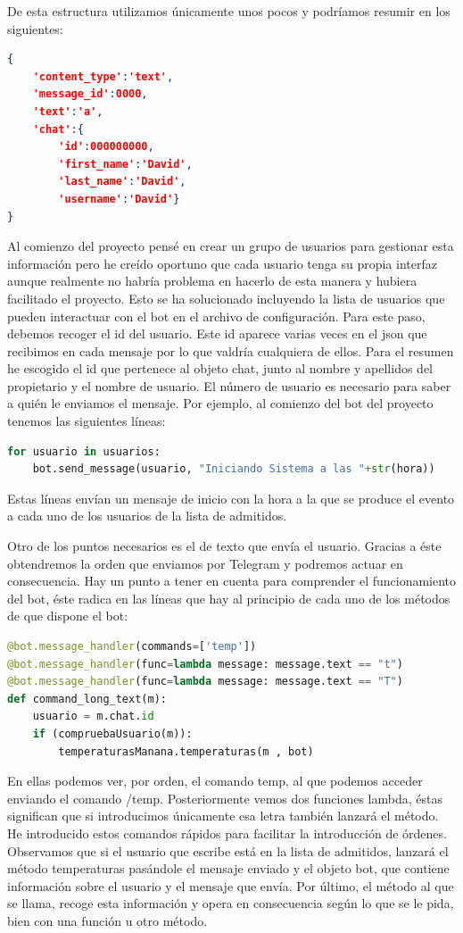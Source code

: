 De esta estructura utilizamos únicamente unos pocos y podríamos resumir en los siguientes:
\begin{lstlisting}[language=json,firstnumber=0, basicstyle=\small, caption={Resumen de los datos que utilizamos del mensaje de Telegram.}]
{
    'content_type':'text',
    'message_id':0000,
    'text':'a',
    'chat':{
        'id':000000000,
        'first_name':'David',
        'last_name':'David',
        'username':'David'}
}
\end{lstlisting}

Al comienzo del proyecto pensé en crear un grupo de usuarios para gestionar esta información pero he creído oportuno que cada usuario tenga su propia interfaz aunque realmente no habría problema en hacerlo de esta manera y hubiera facilitado el proyecto. Esto se ha solucionado incluyendo la lista de usuarios que pueden interactuar con el bot en el archivo de configuración. Para este paso, debemos recoger el id del usuario. Este id aparece varias veces en el json que recibimos en cada mensaje por lo que valdría cualquiera de ellos. Para el resumen he escogido el id que pertenece al objeto chat, junto al nombre y apellidos del propietario y el nombre de usuario.
El número de usuario es necesario para saber a quién le enviamos el mensaje. Por ejemplo, al comienzo del bot del proyecto tenemos las siguientes líneas:

\begin{lstlisting}[language=Python]
for usuario in usuarios:
    bot.send_message(usuario, "Iniciando Sistema a las "+str(hora))
\end{lstlisting}

Estas líneas envían un mensaje de inicio con la hora a la que se produce el evento a cada uno de los usuarios de la lista de admitidos.

Otro de los puntos necesarios es el de texto que envía el usuario. Gracias a éste obtendremos la orden que enviamos por Telegram y podremos actuar en consecuencia.
Hay un punto a tener en cuenta para comprender el funcionamiento del bot, éste radica en las líneas que hay al principio de cada uno de los métodos de que dispone el bot:

\begin{lstlisting}[language=Python]
@bot.message_handler(commands=['temp'])
@bot.message_handler(func=lambda message: message.text == "t")
@bot.message_handler(func=lambda message: message.text == "T")
def command_long_text(m):
    usuario = m.chat.id
    if (compruebaUsuario(m)):
        temperaturasManana.temperaturas(m , bot)
\end{lstlisting}

En ellas podemos ver, por orden, el comando temp, al que podemos acceder enviando el comando /temp. Posteriormente vemos dos funciones lambda, éstas significan que si introducimos únicamente esa letra también lanzará el método. He introducido estos comandos rápidos para facilitar la introducción de órdenes.
Observamos que si el usuario que escribe está en la lista de admitidos, lanzará el método temperaturas pasándole el mensaje enviado y el objeto bot, que contiene información sobre el usuario y el mensaje que envía.
Por último, el método al que se llama, recoge esta información y opera en consecuencia según lo que se le pida, bien con una función u otro método.